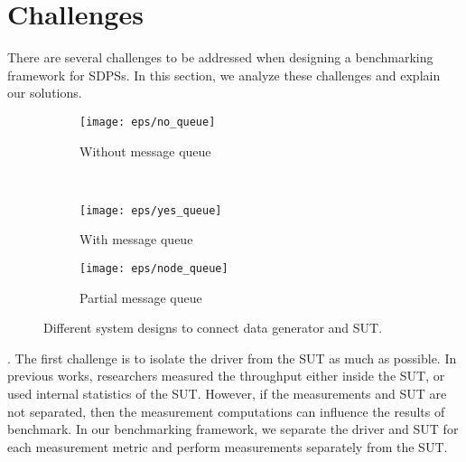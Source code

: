 \section{Challenges}
\label{chal}
There are several challenges to be addressed when designing a benchmarking framework for SDPSs. In this section, we analyze these challenges and explain our solutions.

\begin{figure*}
    \centering
    \begin{subfigure}[b]{0.32\textwidth}
        \texttt{[image: eps/no\_queue]}
        \caption{Without message queue}
        \label{fig_no_queue}
    \end{subfigure}
    ~ %
    \begin{subfigure}[b]{0.32\textwidth}
        \texttt{[image: eps/yes\_queue]}
        \caption{With message queue}
        \label{fig_yes_queue}
    \end{subfigure}
    \begin{subfigure}[b]{0.32\textwidth}
        \texttt{[image: eps/node\_queue]}
        \caption{Partial message queue}
        \label{fig_partial_queue}
    \end{subfigure}
        \caption{Different system designs to connect data generator and SUT. }
            \label{fig_queue_link}
\end{figure*}





. The first challenge is to isolate the  driver from the SUT as much as possible. In previous works, researchers measured the throughput  either  inside the SUT, or used internal statistics of the SUT. %
However, if the measurements and SUT are not separated, then the measurement computations can influence the results of benchmark.
In our benchmarking framework, we separate the driver and SUT for each measurement metric and perform measurements separately from the SUT. 


